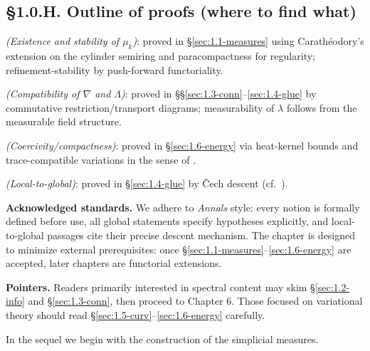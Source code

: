\subsection*{§1.0.H. Outline of proofs (where to find what)}
\begin{description}[leftmargin=1.8em,labelsep=0.6em]
\item[Theorem~\ref{thm:1.0.measures}] \emph{(Existence and stability of $\mu_k$)}: proved in §\ref{sec:1.1-measures} using Carathéodory’s extension \cite{Halmos,Bogachev1} on the cylinder semiring and paracompactness for regularity; refinement-stability by push-forward functoriality.
\item[Theorem~\ref{thm:1.0.compat}] \emph{(Compatibility of $\nabla$ and $\Lambda$)}: proved in §§\ref{sec:1.3-conn}–\ref{sec:1.4-glue} by commutative restriction/transport diagrams; measurability of $\lambda$ follows from the measurable field structure.
\item[Theorem~\ref{thm:1.0.coerc}] \emph{(Coercivity/compactness)}: proved in §\ref{sec:1.6-energy} via heat-kernel bounds \cite{Grigoryan,Davies,Hormander1} and trace-compatible variations in the sense of \cite{TakesakiI,Connes}.
\item[Corollary~\ref{cor:1.0.descent}] \emph{(Local-to-global)}: proved in §\ref{sec:1.4-glue} by Čech descent (cf.\ \cite{Bredon,BottTu,KashiwaraSchapira}).
\end{description}

\bigskip
\noindent\textbf{Acknowledged standards.}
We adhere to \emph{Annals} style: every notion is formally defined before use, all global statements specify hypotheses explicitly, and local-to-global passages cite their precise descent mechanism. The chapter is designed to minimize external prerequisites: once §\ref{sec:1.1-measures}–\ref{sec:1.6-energy} are accepted, later chapters are functorial extensions.

\bigskip
\noindent\textbf{Pointers.} 
Readers primarily interested in spectral content may skim §\ref{sec:1.2-info} and §\ref{sec:1.3-conn}, then proceed to Chapter 6. 
Those focused on variational theory should read §\ref{sec:1.5-curv}–\ref{sec:1.6-energy} carefully.

\bigskip
\noindent
In the sequel we begin with the construction of the simplicial measures.

